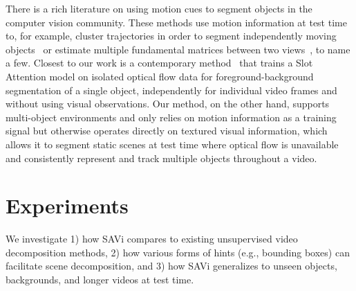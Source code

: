 \documentclass{article}
\newcommand{\modelname}{SAVi\xspace}
\begin{document}
There is a rich literature on using motion cues to segment objects in the computer vision community. These methods use motion information at test time to, for example, cluster trajectories in order to segment independently moving objects~\citep{faktor2014video} or estimate multiple fundamental matrices between two views~\citep{isack2012energy}, to name a few.
Closest to our work is a contemporary method~\citep{yang2021self} that trains a Slot Attention model on isolated optical flow data for foreground-background segmentation of a single object, independently for individual video frames and without using visual observations. Our method, on the other hand, supports multi-object environments and only relies on motion information as a training signal but otherwise operates directly on textured visual information, which allows it to segment static scenes at test time where optical flow is unavailable and consistently represent and track multiple objects throughout a video.

\section{Experiments}
\label{sec:experiments}
We investigate 1) how \modelname compares to existing unsupervised video decomposition methods, 2) how various forms of hints (e.g., bounding boxes) can facilitate scene decomposition, and 3) how \modelname generalizes to unseen objects, backgrounds, and longer videos at test time.
\end{document}
